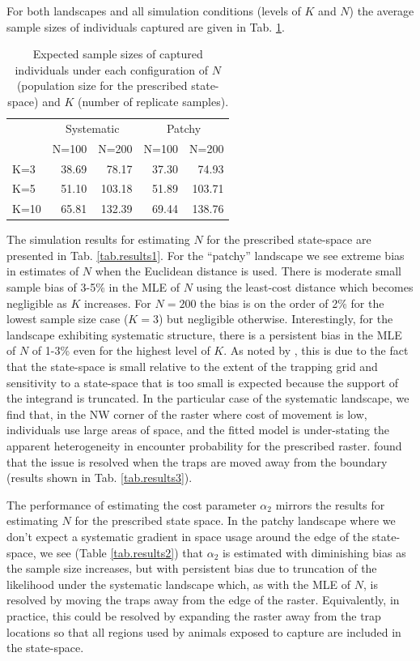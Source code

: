 For both landscapes and all simulation conditions (levels of $K$ and
$N$) the average sample sizes of individuals captured are given in
Tab. \ref{tab.samplesize}.  
\begin{table}[h]
\centering
\caption{
Expected sample sizes of captured individuals under each configuration of
$N$ (population size for the prescribed state-space) and $K$ (number of replicate samples).
}
\begin{tabular}{l|rrrr}
 & \multicolumn{2}{c}{Systematic} & \multicolumn{2}{c}{Patchy}  \\
    & N=100 &  N=200  &   N=100 &  N=200  \\ \hline
K=3 &  38.69 &   78.17  &   37.30 &   74.93  \\
K=5 &  51.10 &  103.18  &   51.89 &  103.71 \\
K=10&  65.81 &  132.39  &   69.44 &  138.76 \\
\end{tabular}
\label{tab.samplesize}
\end{table}
The simulation results for estimating $N$
for the prescribed state-space are presented in Tab.
\ref{tab.results1}.  For the ``patchy'' landscape we see extreme
bias in estimates of $N$ when the Euclidean distance is used. There is
moderate small sample bias of 3-5\% in the MLE of $N$ using the
least-cost distance which becomes negligible as $K$ increases. For
$N=200$ the bias is on the order of 2\% for the lowest sample size
case ($K=3$) but negligible otherwise.  Interestingly, for the
landscape exhibiting systematic structure, there is a persistent bias
in the MLE of $N$ of 1-3\% even for the highest level of $K$.
As noted by \citet{royle_etal:2012ecol}, 
this is due to the fact that
the state-space is small relative to the extent of the trapping grid and
sensitivity to a state-space that is too small is expected because the
support of the integrand is truncated. In the particular case of the
systematic landscape, we find that, in the NW corner of the raster
where cost of movement is low, individuals use large areas of space,
and the fitted model is under-stating the apparent
heterogeneity in encounter probability for the prescribed raster.  \citet{royle_etal:2012ecol}
found that the issue is resolved when the traps are moved away from
the boundary (results shown in Tab. \ref{tab.results3}).

The performance of estimating the cost parameter $\alpha_{2}$ mirrors
the results for estimating $N$ for the prescribed state space. In the
patchy landscape where we don't expect a systematic gradient in space
usage around the edge of the state-space, we see
(Table \ref{tab.results2}) that $\alpha_{2}$ is estimated with
diminishing bias as the sample size increases, but with persistent
bias due to truncation of the likelihood under the systematic
landscape which, as with the MLE of $N$, is resolved by moving the
traps away from the edge of the raster. Equivalently, in practice,
this could be resolved by expanding the raster away from the trap
locations so that all regions used by animals exposed to capture are
included in the state-space.




